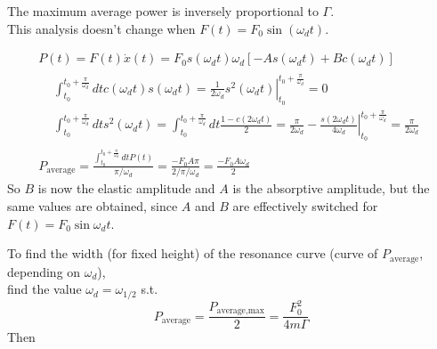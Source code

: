 \documentclass[10pt]{amsart}
\begin{document}
\begin{multicols*}{2}
The maximum average power is inversely proportional to $\Gamma$. \\

This analysis doesn't change when $F(t) = F_0 \sin{(\omega_d t)}$.

\[
\begin{gathered}
	P(t) = F(t) \dot{x}(t) = F_0 s(\omega_d t) \omega_d [ -A s(\omega_d t) + Bc(\omega_d t) ] \\
	\begin{aligned}
		& \int_{t_0}^{t_0 + \frac{\pi}{\omega_d} } dt c(\omega_dt) s(\omega_d t) = \left. \frac{1}{2 \omega_d} s^2(\omega_d t) \right|_{t_0}^{t_0 + \frac{\pi}{\omega_d} } = 0 \\
		& \int_{t_0}^{t_0 + \frac{\pi}{\omega_d} } dt s^2(\omega_dt) = \int_{t_0}^{t_0 + \frac{\pi}{\omega_d} } dt \frac{1 - c(2\omega_dt)}{2} = \frac{\pi}{2 \omega_d} - \left. \frac{s(2\omega_dt)}{ 4\omega_d} \right|_{t_0}^{t_0 + \frac{\pi}{\omega_d} } = \frac{\pi}{2\omega_d}
	\end{aligned} \\
	P_{\text{average}} = \frac{ \int_{t_0}^{t_0 + \frac{\pi}{\omega_d} } dt P(t) }{ \pi /\omega_d} = \frac{-F_0 A \pi}{2 / \pi/\omega_d} = \frac{-F_0 A \omega_d}{2}
\end{gathered}
\]
So $B$ is now the elastic amplitude and $A$ is the absorptive amplitude, but the same values are obtained, since $A$ and $B$ are effectively switched for $F(t) = F_0 \sin{\omega_d t}$.

To find the width (for fixed height) of the resonance curve (curve of $P_{\text{average}}$, depending on $\omega_d$), \\
find the value $\omega_d = \omega_{1/2}$ s.t. 
\[
P_{\text{average}} = \frac{P_{\text{average,max}}}{2} = \frac{F_0^2}{4m \Gamma}
\]
Then


\end{multicols*}
\end{document}
